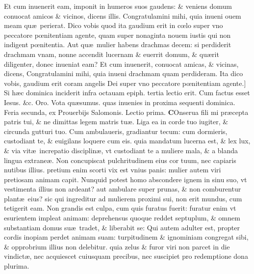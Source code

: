 \documentclass[a5paper,10pt]{book}
\def\rightmarginnote{%
	\lrmarginnote{\hskip\columnwidth \hskip -1em}}
\def\ae{æ}
\def\oe{œ}
\begin{document}
\begin{multicols*}{2}
Et cum inuenerit eam, imponit in humeros suos gaudens: \& veniens domum conuocat amicos \& vicinos, dicens illis.
Congratulamini mihi, quia inueni ouem meam qu\ae \ perierat.
Dico vobis quod ita gaudium erit in c\oe lo super vno peccatore p\oe nitentiam agente, quam super nonaginta nouem iustis qui non indigent p\oe nitentia.
Aut qu\ae \ mulier habens drachmas decem: si perdiderit drachmam vnam, nonne accendit lucernam \& euerrit domum, \& qu\ae rit diligenter, donec inueniat eam?
Et cum inuenerit, conuocat amicas, \& vicinas, dicens, Congratulamini mihi, quia inueni drachmam quam perdideram.
Ita dico vobis, gaudium erit coram angelis Dei super vno peccatore p\oe nitentiam agente.]
\newline {} \color{red} Si h\ae c dominica inciderit infra octauam epiph. tertia lectio erit. \color{black} Cum factus esset Iesus. \&c. \color{red} Oro. \color{black} Vota qu\ae sumus. \color{red} quas inuenies in proxima sequenti dominica. \color{black}
\newline {} \color{red} \hypertarget{MON-SECVNDA-POST-ADV}{Feria secunda,} ex Prouerbijs Salomonis. \hfill Lectio prima. \color{black}
\vspace{-1.5em}
\lettrine[lines=2]{\bfseries C}{}Onserua\rightmarginnote{ca. 6.} fili mi pr\ae cepta patris tui, \& ne dimittas legem matris tu\ae .
Liga ea in corde tuo iugiter, \& circunda gutturi tuo. Cum ambulaueris, gradiantur tecum: cum dormieris, custodiant te, \& euigilans
loquere cum eis. quia mandatum lucerna est, \& lex lux, \& via vit\ae \ increpatio disciplin\ae , vt custodiant te a muliere mala, \& a blanda lingua extrane\ae .
Non concupiscat pulchritudinem eius cor tuum, nec capiaris nutibus illius. pretium enim scorti vix est vnius panis: mulier autem viri pretiosam animam capit.
Nunquid potest homo abscondere ignem in sinu suo, vt vestimenta illius non ardeant?
aut ambulare super prunas, \& non comburentur plant\ae \ eius? sic qui ingreditur ad mulierem proximi sui, non erit mundus, cum tetigerit eam.
Non grandis est culpa, cum quis furatus fuerit: furatur enim vt esurientem impleat animam: deprehensus quoque reddet septuplum, \& omnem substantiam domus su\ae \ tradet, \& liberabit se: Qui autem adulter est, propter cordis inopiam perdet animam suam: turpitudinem \& ignominiam congregat sibi, \& opprobrium illius non delebitur. quia zelus \& furor viri non parcet in die vindict\ae , nec acquiescet cuiusquam precibus, nec suscipiet pro redemptione dona plurima.
\fancyhead[C]{\color{red} Feria. ij. Dominic\ae . ij. post aduentum}

\end{multicols*}
\end{document}
